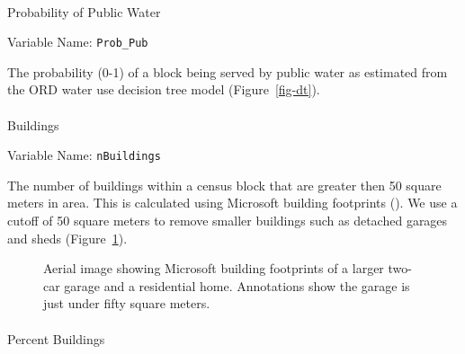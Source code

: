 \documentclass[12pt]{article}
\makeatletter
\let\oldparagraph\paragraph
\renewcommand{\paragraph}{
    \@ifstar
      \xxxParagraphStar
      \xxxParagraphNoStar
  }
\newcommand{\xxxParagraphStar}[1]{\oldparagraph*{#1}\mbox{}}
\newcommand{\xxxParagraphNoStar}[1]{\oldparagraph{#1}\mbox{}}
\makeatother
\begin{document}
\paragraph{Probability of Public
Water}\label{probability-of-public-water}

Variable Name: \texttt{Prob\_Pub}

The probability (0-1) of a block being served by public water as
estimated from the ORD water use decision tree model
(Figure~\ref{fig-dt}).

\paragraph{Buildings}\label{buildings}

Variable Name: \texttt{nBuildings}

The number of buildings within a census block that are greater then 50
square meters in area. This is calculated using Microsoft building
footprints (). We use a cutoff of 50
square meters to remove smaller buildings such as detached garages and
sheds (Figure~\ref{fig-mbfp}).

\begin{figure}


\caption{\label{fig-mbfp}Aerial image showing Microsoft building
footprints of a larger two-car garage and a residential home.
Annotations show the garage is just under fifty square meters.}

\end{figure}%

\paragraph{Percent Buildings}\label{percent-buildings}
\end{document}
